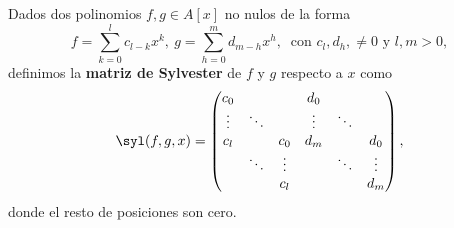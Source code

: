 \begin{definicion}
    Dados dos polinomios $f,g \in A[x]$ no nulos de la forma
    $$f = \sum_{k=0}^l c_{l-k} x^k,\ g = \sum_{h=0}^m d_{m-h} x^h,\ \text{ con } c_l, d_h,\neq 0 \text{ y } l,m>0,$$
    definimos la \textbf{matriz de Sylvester} de $f$ y $g$ respecto a $x$ como
    \begin{equation*}
        \syl(f,g,x) = \begin{pmatrix}
            c_0     &           &           & d_0\\
            \vdots  & \ddots    &           & \vdots &\ddots  &\\
            c_l     &           & c_0       & d_m    &       & d_0\\
                    & \ddots    & \vdots    &        & \ddots      &\vdots\\
                    &           & c_l       &        &              &d_m   
        \end{pmatrix},
    \end{equation*}
    donde el resto de posiciones son cero.
\end{definicion}

